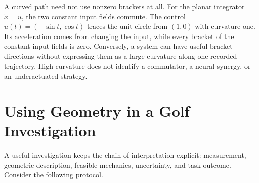 A curved path need not use nonzero brackets at all. For the planar integrator
$\dot x=u$, the two constant input fields commute. The control
$u(t)=(-\sin t,\cos t)$ traces the unit circle from $(1,0)$ with curvature
one. Its acceleration comes from changing the input, while every bracket of
the constant input fields is zero. Conversely, a system can have useful
bracket directions without expressing them as a large curvature along one
recorded trajectory. High curvature does not identify a commutator, a neural
synergy, or an underactuated strategy.

\section{Using Geometry in a Golf Investigation}

A useful investigation keeps the chain of interpretation explicit:
measurement, geometric description, feasible mechanics, uncertainty, and
task outcome. Consider the following protocol.

